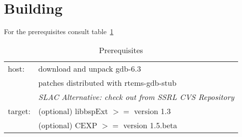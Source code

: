 \documentclass{article}
\begin{document}
\section{Building}
For the prerequisites consult table~\ref{tbl:prereq}
\begin{table}
\begin{center}
\begin{tabular}{ll}
host: & download and unpack gdb-6.3\\
      & patches distributed with rtems-gdb-stub\\
      & {\em SLAC Alternative: check out from SSRL CVS Repository}\\
target: & (optional) libbspExt $>=$ version 1.3\\
        & (optional) CEXP $>=$ version 1.5.beta
\end{tabular}
\caption{Prerequisites}
\label{tbl:prereq}
\end{center}
\end{table}
\end{document}

